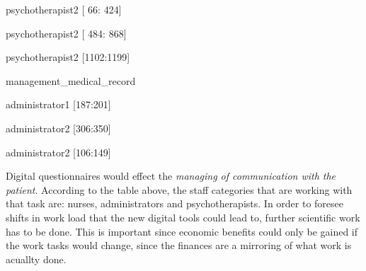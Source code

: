 \documentclass[12pt,a4paper,oneside]{article}
\begin{document}
\begin{itemize}
{ \item psychotherapist2 [  66: 424] }%
{ \item psychotherapist2 [ 484: 868] }%
{ \item psychotherapist2 [1102:1199] }%
\end{itemize}
{management\_medical\_record}%
\begin{itemize}
{ \item administrator1 [187:201] }%
{ \item administrator2 [306:350] }%
{ \item administrator2 [106:149] }%
\end{itemize}

Digital questionnaires would effect the {\it managing of communication with the patient}. According to the table above, the staff categories that are working with that task are: nurses, administrators and psychotherapists.
In order to foresee shifts in work load that the new digital tools could lead to, further scientific work has to be done. This is important since economic benefits could only be gained if the work tasks would change, since the finances are a mirroring of what work is acuallty done.
\end{document}
